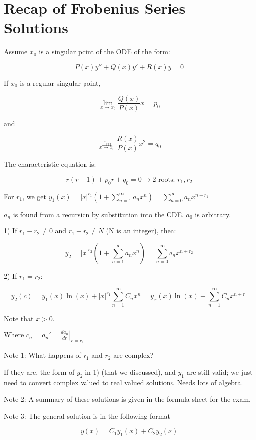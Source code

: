 \graphicspath{{./Lecture6/}}

\section{Recap of Frobenius Series Solutions}

Assume $x_0$ is a singular point of the ODE of the form:

$$P(x) y'' + Q(x) y' + R(x) y = 0$$

If $x_0$ is a regular singular point,

$$\lim_{x \to x_0} \frac{Q(x)}{P(x)} x = p_0$$

and

$$\lim_{x \to x_0} \frac{R(x)}{P(x)} x^2 = q_0$$

The characteristic equation is:

$$r(r-1) + p_0 r + q_0 = 0 \longrightarrow \text{2 roots: } r_1, r_2$$

For $r_1$, we get $y_1(x) = |x|^{r_1} \left( 1 + \sum_{n= 1}^{\infty} a_n x^n \right) = \sum_{n = 0}^\infty a_n x^{n + r_1}$

$a_n$ is found from a recursion by substitution into the ODE. $a_0$ is arbitrary. 

\hfill

1) If $r_1 - r_2 \neq 0$ and $r_1 - r_2 \neq N$ (N is an integer), then:

$$y_2 = |x|^{r_2} \left(1 + \sum_{n = 1}^\infty a_n x^n \right) = \sum_{n = 0}^\infty a_n x^{n + r_2}$$

2) If $r_1 = r_2$:

$$y_2(c) = y_1 (x) \ln(x) + |x| ^{r_1} \sum_{n = 1}^\infty C_n x^n = y_x(x) \ln(x) + \sum_{n = 1}^\infty C_n x^{n + r_1}$$

Note that $x > 0$. 

\hfill

Where $c_n = a_n ' = \left. \frac{d a_n}{dr} \right|_{r = r_1}$


Note 1: What happens of $r_1$ and $r_2$ are complex?

If they are, the form of $y_2$ in 1) (that we discussed), and $y_1$ are still valid; we just need to convert complex valued to real valued solutions. Needs lots of algebra. 

Note 2: A summary of these solutions is given in the formula sheet for the exam. 

Note 3: The general solution is in the following format:

$$y(x) = C_1 y_1(x) + C_2 y_2(x)$$

